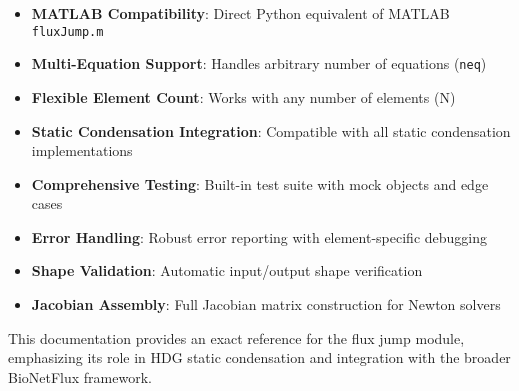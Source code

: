 \begin{itemize}
    \item \textbf{MATLAB Compatibility}: Direct Python equivalent of MATLAB \texttt{fluxJump.m}
    \item \textbf{Multi-Equation Support}: Handles arbitrary number of equations (\texttt{neq})
    \item \textbf{Flexible Element Count}: Works with any number of elements (N)
    \item \textbf{Static Condensation Integration}: Compatible with all static condensation implementations
    \item \textbf{Comprehensive Testing}: Built-in test suite with mock objects and edge cases
    \item \textbf{Error Handling}: Robust error reporting with element-specific debugging
    \item \textbf{Shape Validation}: Automatic input/output shape verification
    \item \textbf{Jacobian Assembly}: Full Jacobian matrix construction for Newton solvers
\end{itemize}

This documentation provides an exact reference for the flux jump module, emphasizing its role in HDG static condensation and integration with the broader BioNetFlux framework.

